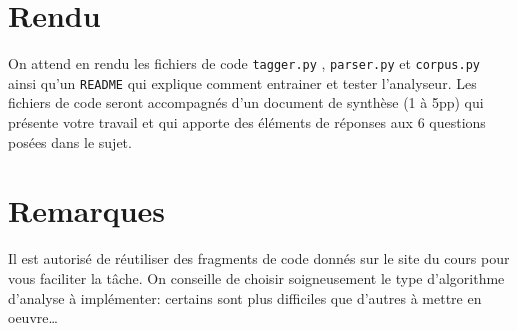 \documentclass[a4paper,11pt]{article}
\begin{document}
\section{Rendu}
On attend en rendu les fichiers de code \verb+tagger.py+ , \verb+parser.py+
et \verb+corpus.py+ ainsi qu'un \verb+README+ qui explique comment entrainer et tester l'analyseur. Les fichiers de code seront accompagnés d'un document de synthèse (1 à 5pp) qui présente votre travail et qui apporte des éléments de réponses aux 6 questions posées dans le sujet.


\section{Remarques}
Il est autorisé de réutiliser des fragments de code donnés sur le site du cours
pour vous faciliter la tâche. On conseille de choisir soigneusement le type d'algorithme d'analyse à implémenter: certains sont plus difficiles que d'autres à mettre en oeuvre\ldots
\end{document}

